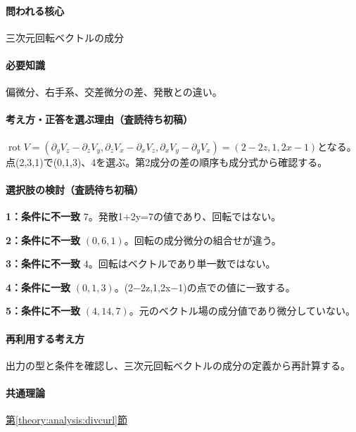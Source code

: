 \paragraph{問われる核心} 三次元回転ベクトルの成分

\paragraph{必要知識} 偏微分、右手系、交差微分の差、発散との違い。

\paragraph{考え方・正答を選ぶ理由（査読待ち初稿）} \(\operatorname{rot}V=(\partial_yV_z-\partial_zV_y,\partial_zV_x-\partial_xV_z,\partial_xV_y-\partial_yV_x)=(2-2z,1,2x-1)\)となる。点(2,3,1)で(0,1,3)、4を選ぶ。第2成分の差の順序も成分式から確認する。

\paragraph{選択肢の検討（査読待ち初稿）}\mbox{}\par

\noindent\textbf{1：条件に不一致} \(7\)。発散1+2y=\allowbreak{}7の値であり、回転ではない。\par

\noindent\textbf{2：条件に不一致} \((0,6,1)\)。回転の成分微分の組合せが違う。\par

\noindent\textbf{3：条件に不一致} \(4\)。回転はベクトルであり単一数ではない。\par

\noindent\textbf{4：条件に一致} \((0,1,3)\)。(2−2z,1,2x−1)の点での値に一致する。\par

\noindent\textbf{5：条件に不一致} \((4,14,7)\)。元のベクトル場の成分値であり微分していない。\par

\paragraph{再利用する考え方} 出力の型と条件を確認し、三次元回転ベクトルの成分の定義から再計算する。

\paragraph{共通理論} \hyperref[theory:analysis:divcurl]{第\ref*{theory:analysis:divcurl}節}

